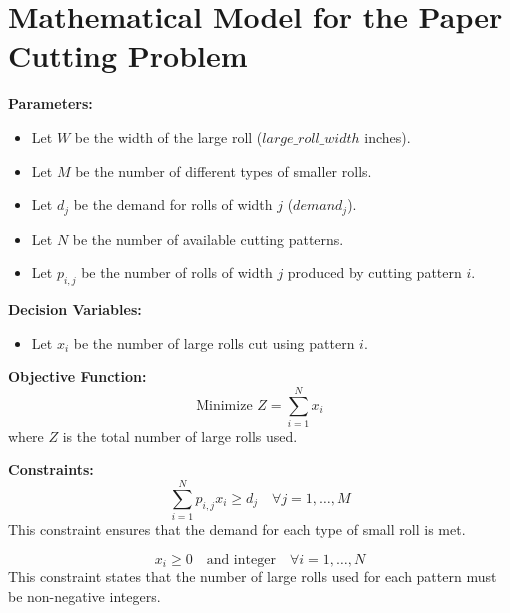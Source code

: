 \documentclass{article}
\begin{document}
\section*{Mathematical Model for the Paper Cutting Problem}

\textbf{Parameters:}
\begin{itemize}
    \item Let $W$ be the width of the large roll ($large\_roll\_width$ inches).
    \item Let $M$ be the number of different types of smaller rolls.
    \item Let $d_j$ be the demand for rolls of width $j$ ($demand_j$).
    \item Let $N$ be the number of available cutting patterns.
    \item Let $p_{i,j}$ be the number of rolls of width $j$ produced by cutting pattern $i$.
\end{itemize}

\textbf{Decision Variables:}
\begin{itemize}
    \item Let $x_i$ be the number of large rolls cut using pattern $i$.
\end{itemize}

\textbf{Objective Function:}
\[
\text{Minimize } Z = \sum_{i=1}^{N} x_i
\]
where $Z$ is the total number of large rolls used.

\textbf{Constraints:}
\[
\sum_{i=1}^{N} p_{i,j} x_i \geq d_j \quad \forall j = 1, \ldots, M
\]
This constraint ensures that the demand for each type of small roll is met.

\[
x_i \geq 0 \quad \text{and integer} \quad \forall i = 1, \ldots, N
\]
This constraint states that the number of large rolls used for each pattern must be non-negative integers.
\end{document}
